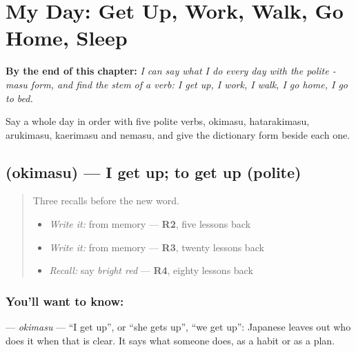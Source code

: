 
\chapter{My Day: Get Up, Work, Walk, Go Home, Sleep}
\label{ch:ja-my-day-get-up-work-walk-go-home-sleep}

\begin{chapteropening}
\textbf{By the end of this chapter:} \emph{I can say what I do every day with the polite -masu form, and find the stem of a verb: I get up, I work, I walk, I go home, I go to bed.}

Say a whole day in order with five polite verbs, okimasu, hatarakimasu, arukimasu, kaerimasu and nemasu, and give the dictionary form beside each one.
\end{chapteropening}

\section[\texorpdfstring{\ja{おきます} (okimasu)}{おきます (okimasu)}]{ (okimasu) — I get up; to get up (polite)}

\label{lesson:JA-C138-okimasu}



\begin{quote}
Three recalls before the new word.

\begin{itemize}
\raggedright
  \item \emph{Write it:} \textbf{} from memory — \textbf{R2}, five lessons back
  \item \emph{Write it:} \textbf{} from memory — \textbf{R3}, twenty lessons back
  \item \emph{Recall:} say \emph{bright red} — \textbf{R4}, eighty lessons back
\end{itemize}
\end{quote}

\subsection*{You'll want to know: }
\textbf{} — \emph{okimasu} — \textquotedblleft{}I get up\textquotedblright{}, or \textquotedblleft{}she gets up\textquotedblright{}, \textquotedblleft{}we get up\textquotedblright{}: Japanese leaves out who does it when that is clear. It says what someone does, as a habit or as a plan.

